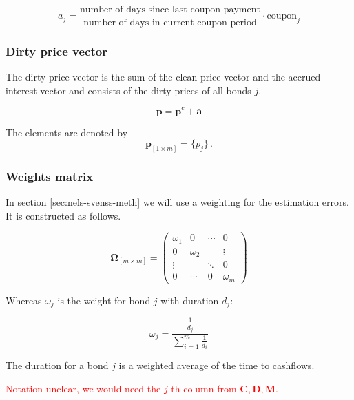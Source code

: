 \begin{equation}
    a_j= \frac{\mbox{number of days since last coupon payment}}{\mbox{number of days in current coupon period}}\cdot \mbox{coupon}_j
\end{equation}
 	

\subsubsection*{Dirty price vector}

The dirty price vector is the sum of the clean price vector and the accrued interest vector and consists of the dirty prices of all bonds $j$.

\begin{displaymath}
\bm{p}=\bm{p}^c+\bm{a}
\end{displaymath}

The elements are denoted by 
\begin{equation}\label{pd}
    \bm{p}_{\left[1\times m\right]}= \{p_j\}\,.
\end{equation}


\subsubsection*{Weights matrix}

In section \ref{sec:nels-svenss-meth} we will use a weighting for the estimation errors. It is constructed  as follows.

\begin{equation}\label{weights}
    \bm{\Omega}_{\left[m\times m\right]}= \begin{pmatrix}
 \omega_1 & 0 &\cdots  &0  \\
 0 & \omega_2 &  & \vdots \\
 \vdots &  & \ddots & 0 \\
 0 &\cdots  &0  & \omega_m
\end{pmatrix}
\end{equation}

Whereas $\omega_j$ is the weight for bond $j$ with duration $d_j$:

\begin{displaymath}
    \omega_j=\frac{\frac{1}{d_j}}{\sum_{i=1}^m\frac{1}{d_i}}
\end{displaymath}


The duration for a bond $j$ is a weighted average of the time to cashflows.

\textcolor{red}{Notation unclear, we would need the $j$-th column from $\bm{C,D,M}$.}

